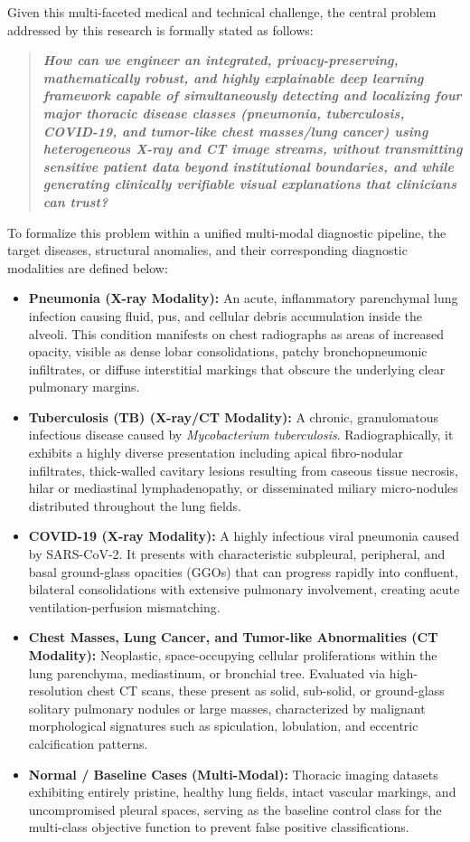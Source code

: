 Given this multi-faceted medical and technical challenge, the central problem addressed by this research is formally stated as follows:

\begin{quote}
	\textit{\textbf{How can we engineer an integrated, privacy-preserving, mathematically robust, and highly explainable deep learning framework capable of simultaneously detecting and localizing four major thoracic disease classes (pneumonia, tuberculosis, COVID-19, and tumor-like chest masses/lung cancer) using heterogeneous X-ray and CT image streams, without transmitting sensitive patient data beyond institutional boundaries, and while generating clinically verifiable visual explanations that clinicians can trust?}}
\end{quote}

To formalize this problem within a unified multi-modal diagnostic pipeline, the target diseases, structural anomalies, and their corresponding diagnostic modalities are defined below:

\begin{itemize}
	\item \textbf{Pneumonia (X-ray Modality):} An acute, inflammatory parenchymal lung infection causing fluid, pus, and cellular debris accumulation inside the alveoli. This condition manifests on chest radiographs as areas of increased opacity, visible as dense lobar consolidations, patchy bronchopneumonic infiltrates, or diffuse interstitial markings that obscure the underlying clear pulmonary margins.
	\item \textbf{Tuberculosis (TB) (X-ray/CT Modality):} A chronic, granulomatous infectious disease caused by \textit{Mycobacterium tuberculosis}. Radiographically, it exhibits a highly diverse presentation including apical fibro-nodular infiltrates, thick-walled cavitary lesions resulting from caseous tissue necrosis, hilar or mediastinal lymphadenopathy, or disseminated miliary micro-nodules distributed throughout the lung fields.
	\item \textbf{COVID-19 (X-ray Modality):} A highly infectious viral pneumonia caused by SARS-CoV-2. It presents with characteristic subpleural, peripheral, and basal ground-glass opacities (GGOs) that can progress rapidly into confluent, bilateral consolidations with extensive pulmonary involvement, creating acute ventilation-perfusion mismatching.
	\item \textbf{Chest Masses, Lung Cancer, and Tumor-like Abnormalities (CT Modality):} Neoplastic, space-occupying cellular proliferations within the lung parenchyma, mediastinum, or bronchial tree. Evaluated via high-resolution chest CT scans, these present as solid, sub-solid, or ground-glass solitary pulmonary nodules or large masses, characterized by malignant morphological signatures such as spiculation, lobulation, and eccentric calcification patterns.
	\item \textbf{Normal / Baseline Cases (Multi-Modal):} Thoracic imaging datasets exhibiting entirely pristine, healthy lung fields, intact vascular markings, and uncompromised pleural spaces, serving as the baseline control class for the multi-class objective function to prevent false positive classifications.
\end{itemize}


